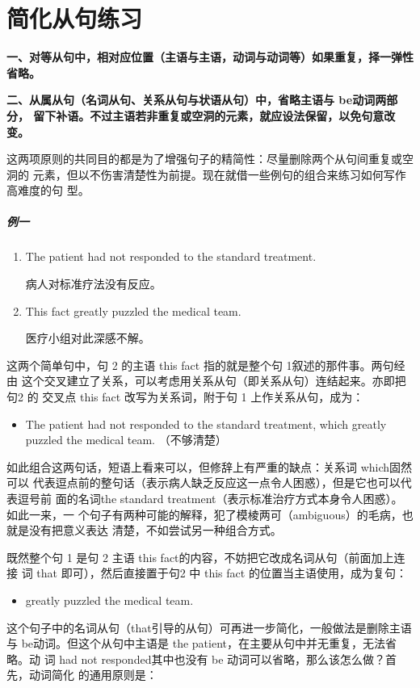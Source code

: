 
\chapter{简化从句练习}

\textbf{一、对等从句中，相对应位置（主语与主语，动词与动词等）如果重复，择一弹性省略。}

\textbf{二、从属从句（名词从句、关系从句与状语从句）中，省略主语与 be动词两部分，
  留下补语。不过主语若非重复或空洞的元素，就应设法保留，以免句意改变。}

这两项原则的共同目的都是为了增强句子的精简性：尽量删除两个从句间重复或空洞的
元素，但以不伤害清楚性为前提。现在就借一些例句的组合来练习如何写作高难度的句
型。

\paragraph{例一}

\begin{enumerate}
\item The patient had not responded to the standard treatment.

  病人对标准疗法没有反应。
\item This fact greatly puzzled the medical team.

  医疗小组对此深感不解。
\end{enumerate}

这两个简单句中，句 2 的主语 this fact 指的就是整个句 1叙述的那件事。两句经由
这个交叉建立了关系，可以考虑用关系从句（即关系从句）连结起来。亦即把句2 的
交叉点 this fact 改写为关系词，附于句 1 上作关系从句，成为：
\begin{itemize}
\item The patient had not responded to the standard treatment, which greatly
  puzzled the medical team. （不够清楚）
\end{itemize}

如此组合这两句话，短语上看来可以，但修辞上有严重的缺点：关系词 which固然可以
代表逗点前的整句话（表示病人缺乏反应这一点令人困惑），但是它也可以代表逗号前
面的名词the standard treatment（表示标准治疗方式本身令人困惑）。如此一来，一
个句子有两种可能的解释，犯了模棱两可（ambiguous）的毛病，也就是没有把意义表达
清楚，不如尝试另一种组合方式。

既然整个句 1 是句 2 主语 this fact的内容，不妨把它改成名词从句（前面加上连接
词 that 即可），然后直接置于句2 中 this fact 的位置当主语使用，成为复句：
\begin{itemize}
\item {} greatly
  puzzled the medical team.
\end{itemize}
这个句子中的名词从句（that引导的从句）可再进一步简化，一般做法是删除主语
与 be动词。但这个从句中主语是 the patient，在主要从句中并无重复，无法省略。动
词 had not responded其中也没有 be 动词可以省略，那么该怎么做？首先，动词简化
的通用原则是：

